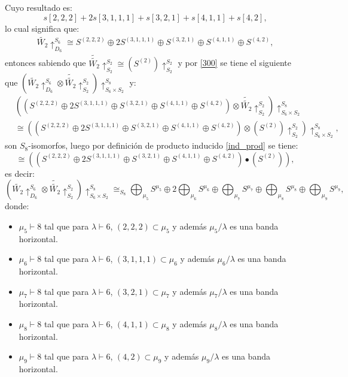 \documentclass[12pt]{book}
\theoremstyle{definition}
\newcounter{in}
\newcounter{ini}
\begin{document}
Cuyo resultado es:
$$s\left [ 2, 2, 2 \right ] + 2s\left [ 3, 1, 1, 1 \right ] + s\left [ 3, 2, 1 \right ] + s\left [ 4, 1, 1 \right ] + s\left [ 4, 2 \right ],$$
lo cual significa que:
\begin{equation}
\begin{aligned}
\tilde{W_{2}} \uparrow_{D_{6}}^{S_{6}}  \cong S^{(2, 2, 2)} \oplus 2S^{(3, 1, 1, 1)} \oplus S^{(3, 2, 1)} \oplus S^{(4, 1, 1)} \oplus S^{(4, 2)},
\end{aligned}
\end{equation}
entonces sabiendo que $\tilde{\tilde{W_{2}}} \uparrow_{S_{2}}^{S_{2}} \cong (S^{(2)}) \uparrow_{S_{2}}^{S_{2}}$ y por \ref{300} se tiene el siguiente que $(\tilde{W_{2}} \uparrow_{D_{6}}^{S_{6}} \otimes \tilde{\tilde{W_{2}}} \uparrow_{S_{2}}^{S_{2}}) \uparrow_{S_{6}\times S_{2}}^{S_{8}}$ y:
\begin{equation}
\begin{aligned}
 & ((S^{(2, 2, 2)} \oplus 2S^{(3, 1, 1, 1)} \oplus S^{(3, 2, 1)} \oplus S^{(4, 1, 1)} \oplus S^{(4, 2)}) \otimes \tilde{\tilde{W_{2}}} \uparrow_{S_{2}}^{S_{2}}) \uparrow_{S_{6}\times S_{2}}^{S_{8}} \\
& \cong  ((S^{(2, 2, 2)} \oplus 2S^{(3, 1, 1, 1)} \oplus S^{(3, 2, 1)} \oplus S^{(4, 1, 1)} \oplus S^{(4, 2)}) \otimes (S^{(2)}) \uparrow_{S_{2}}^{S_{2}}) \uparrow_{S_{6}\times S_{2}}^{S_{8}},
\end{aligned}
\end{equation}
son $S_{8}$-isomorfos, luego por definición de producto inducido  \ref{ind_prod} se tiene:
\begin{equation}
\cong  ((S^{(2, 2, 2)} \oplus 2S^{(3, 1, 1, 1)} \oplus S^{(3, 2, 1)} \oplus S^{(4, 1, 1)} \oplus S^{(4, 2)}) \bullet (S^{(2)})),
\end{equation}
es decir:
\begin{equation*}
(\tilde{W_{2}} \uparrow_{D_{6}}^{S_{6}} \otimes \tilde{\tilde{W_{2}}} \uparrow_{S_{2}}^{S_{2}}) \uparrow_{S_{6}\times S_{2}}^{S_{8}} \cong_{S_{8}} \bigoplus_{\mu_{5}} S^{\mu_{5}} \oplus 2\bigoplus_{\mu_{6}} S^{\mu_{6}} \oplus \bigoplus_{\mu_{7}} S^{\mu_{7}} \oplus \bigoplus_{\mu_{8}} S^{\mu_{8}} \oplus \bigoplus_{\mu_{9}} S^{\mu_{9}},
\end{equation*}
donde:
\begin{itemize}
\item $\mu_{5} \vdash 8$ tal que para $\lambda \vdash 6$, $(2,2,2) \subset \mu_{5}$ y además $\mu_{5} / \lambda$ es una banda horizontal. 
\item $\mu_{6} \vdash 8$ tal que para $\lambda \vdash 6$, $(3,1,1,1) \subset \mu_{6}$ y además $\mu_{6} / \lambda$ es una banda horizontal. 
\item $\mu_{7} \vdash 8$ tal que para $\lambda \vdash 6$, $(3,2,1) \subset \mu_{7}$ y además $\mu_{7} / \lambda$ es una banda horizontal.
\item $\mu_{8} \vdash 8$ tal que para $\lambda \vdash 6$, $(4,1,1) \subset \mu_{8}$ y además $\mu_{8} / \lambda$ es una banda horizontal.
\item $\mu_{9} \vdash 8$ tal que para $\lambda \vdash 6$, $(4,2) \subset \mu_{9}$ y además $\mu_{9} / \lambda$ es una banda horizontal.
\end{itemize}
\end{document}

